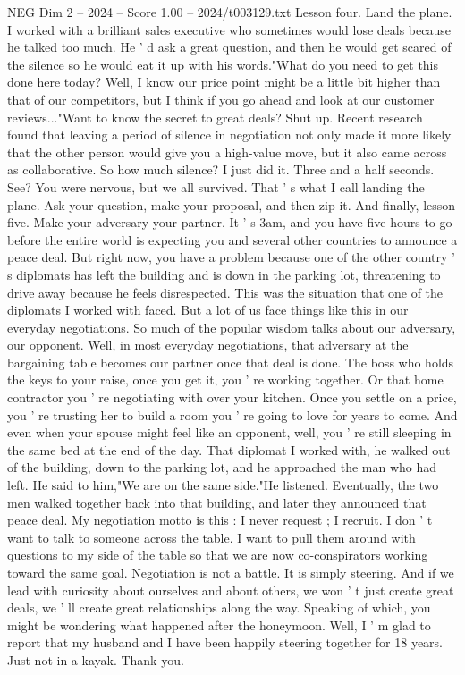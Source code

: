 \begin{textsample}{NEG Dim 2 – 2024 – Score 1.00 – 2024/t003129.txt}
Lesson four.
Land the plane.
I worked with a brilliant sales executive who sometimes would lose deals because he talked too much.
He ' d ask a great question, and then he would get scared of the silence so he would eat it up with his words."What do you need to get this done here today?
Well, I know our price point might be a little bit higher than that of our competitors, but I think if you go ahead and look at our customer reviews..."Want to know the secret to great deals?
Shut up.
Recent research found that leaving a period of silence in negotiation not only made it more likely that the other person would give you a high-value move, but it also came across as collaborative.
So how much silence?
I just did it.
Three and a half seconds.
See?
You were nervous, but we all survived.
That ' s what I call landing the plane.
Ask your question, make your proposal, and then zip it.
And finally, lesson five.
Make your adversary your partner.
It ' s 3am, and you have five hours to go before the entire world is expecting you and several other countries to announce a peace deal.
But right now, you have a problem because one of the other country ' s diplomats has left the building and is down in the parking lot, threatening to drive away because he feels disrespected.
This was the situation that one of the diplomats I worked with faced.
But a lot of us face things like this in our everyday negotiations.
So much of the popular wisdom talks about our adversary, our opponent.
Well, in most everyday negotiations, that adversary at the bargaining table becomes our partner once that deal is done.
The boss who holds the keys to your raise, once you get it, you ' re working together.
Or that home contractor you ' re negotiating with over your kitchen.
Once you settle on a price, you ' re trusting her to build a room you ' re going to love for years to come.
And even when your spouse might feel like an opponent, well, you ' re still sleeping in the same bed at the end of the day.
That diplomat I worked with, he walked out of the building, down to the parking lot, and he approached the man who had left.
He said to him,"We are on the same side."He listened.
Eventually, the two men walked together back into that building, and later they announced that peace deal.
My negotiation motto is this : I never request ; I recruit.
I don ' t want to talk to someone across the table.
I want to pull them around with questions to my side of the table so that we are now co-conspirators working toward the same goal.
Negotiation is not a battle.
It is simply steering.
And if we lead with curiosity about ourselves and about others, we won ' t just create great deals, we ' ll create great relationships along the way.
Speaking of which, you might be wondering what happened after the honeymoon.
Well, I ' m glad to report that my husband and I have been happily steering together for 18 years.
Just not in a kayak.
Thank you.

\end{textsample}
